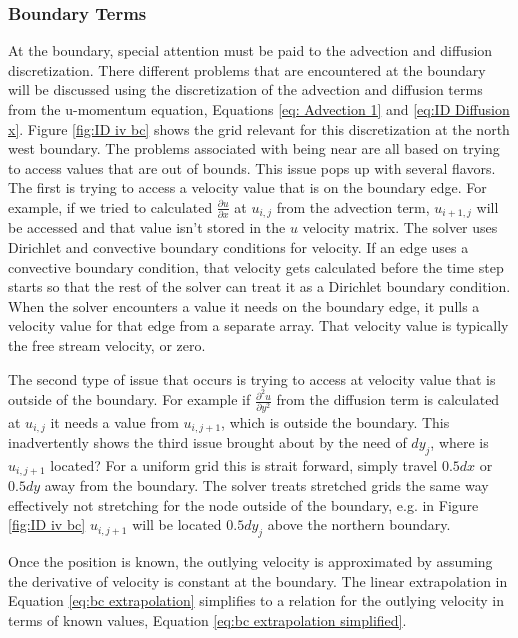 \documentclass[onehalf,11pt]{beavtex}
\begin{document}
\subsubsection{Boundary Terms}
At the boundary, special attention must be paid to the advection and diffusion discretization.
There different problems that are encountered at the boundary will be discussed using the discretization of the advection and diffusion terms from the u-momentum equation, Equations \eqref{eq: Advection 1} and \eqref{eq:ID Diffusion x}.
Figure \ref{fig:ID iv bc} shows the grid relevant for this discretization at the north west boundary. 
The problems associated with being near are all based on trying to access values that are out of bounds.
This issue pops up with several flavors.
The first is trying to access a velocity value that is on the boundary edge.
For example, if we tried to calculated $\frac{\partial u}{\partial x}$ at $u_{i,j}$ from the advection term, $u_{i+1,j}$ will be accessed and that value isn't stored in the $u$ velocity matrix.
The solver uses Dirichlet and convective boundary conditions for velocity.
If an edge uses a convective boundary condition, that velocity gets calculated before the time step starts so that the rest of the solver can treat it as a Dirichlet boundary condition.
When the solver encounters a value it needs on the boundary edge, it pulls a velocity value for that edge from a separate array.
That velocity value is typically the free stream velocity, or zero.

The second type of issue that occurs is trying to access at velocity value that is outside of the boundary. 
For example if $\frac{\partial^2 u}{\partial y^2}$ from the diffusion term is calculated at $u_{i,j}$ it needs a value from $u_{i,j+1}$, which is outside the boundary.
This inadvertently shows the third issue brought about by the need of $dy_j$, where is $u_{i,j+1}$ located?
For a uniform grid this is strait forward, simply travel $0.5dx$ or $0.5dy$ away from the boundary.
The solver treats stretched grids the same way effectively not stretching for the node outside of the boundary, e.g. in Figure \ref{fig:ID iv bc} $u_{i,j+1}$ will be located $0.5dy_j$ above the northern boundary.

Once the position is known, the outlying velocity is approximated by assuming the derivative of velocity is constant at the boundary. 
The linear extrapolation in Equation \eqref{eq:bc extrapolation} simplifies to a relation for the outlying velocity in terms of known values, Equation \eqref{eq:bc extrapolation simplified}.
\end{document}
